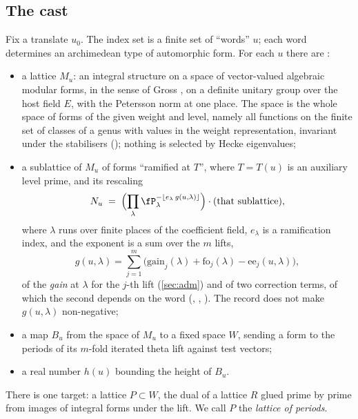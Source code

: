 \subsection{The cast}\label{sec:cast}
Fix a translate $u_0$. The index set is a finite set of ``words'' $u$; each word determines
an archimedean type of automorphic form. For each $u$ there are \lvS:
\begin{itemize}
\item a lattice $M_u$: an integral structure on a space of vector-valued algebraic modular
  forms, in the sense of Gross \cite{gross1999}, on a definite unitary group over the host
  field $E$, with the Petersson norm at one place. The space is the whole space of forms of
  the given weight and level, namely all functions on the finite set of classes of a genus
  with values in the weight representation, invariant under the stabilisers
  (); nothing is selected by Hecke eigenvalues;
\item a sublattice of $M_u$ of forms ``ramified at $T$'', where $T=T(u)$ is an auxiliary level
  prime, and its rescaling
  \begin{equation}\label{eq:Nu}
  N_u\;=\;\Bigl(\prod_{\lambda}\fP_\lambda^{-\lfloor e_\lambda\,g(u,\lambda)\rfloor}\Bigr)\cdot(\text{that sublattice}),
  \end{equation}
  where $\lambda$ runs over finite places of the coefficient field, $e_\lambda$ is a ramification
  index, and the exponent is a sum over the $m$ lifts,
  \[
  g(u,\lambda)=\sum_{j=1}^{m}\bigl(\mathrm{gain}_j(\lambda)+\mathrm{fo}_j(\lambda)-\mathrm{ee}_j(u,\lambda)\bigr),
  \]
  of the \emph{gain} at $\lambda$ for the $j$-th lift (\cref{sec:adm}) and of two correction
  terms, of which the second depends on the word (, , ).
  The record does not make $g(u,\lambda)$ non-negative;
\item a map $B_u$ from the space of $M_u$ to a fixed space $W$, sending a form to the periods
  of its $m$-fold iterated theta lift against test vectors;
\item a real number $h(u)$ bounding the height of $B_u$.
\end{itemize}
There is one target: a lattice $P\subset W$, the dual of a lattice $R$ glued prime by prime
from images of integral forms under the lift. We call $P$ the \emph{lattice of periods}.

